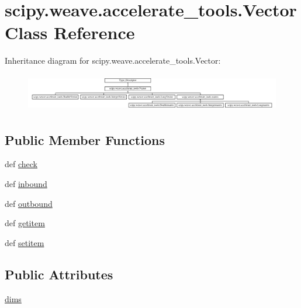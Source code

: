 \hypertarget{classscipy_1_1weave_1_1accelerate__tools_1_1Vector}{}\section{scipy.\+weave.\+accelerate\+\_\+tools.\+Vector Class Reference}
\label{classscipy_1_1weave_1_1accelerate__tools_1_1Vector}
Inheritance diagram for scipy.\+weave.\+accelerate\+\_\+tools.\+Vector\+:\begin{figure}[H]
\begin{center}
\leavevmode
\includegraphics[height=1.659259cm]{classscipy_1_1weave_1_1accelerate__tools_1_1Vector}
\end{center}
\end{figure}
\subsection*{Public Member Functions}
\begin{DoxyCompactItemize}
\item 
def \hyperlink{classscipy_1_1weave_1_1accelerate__tools_1_1Vector_ada2a78b6ea5d4e2d3ae79f5937684745}{check}
\item 
def \hyperlink{classscipy_1_1weave_1_1accelerate__tools_1_1Vector_a78512e6a66fc47f577a08cc29c08f6f4}{inbound}
\item 
def \hyperlink{classscipy_1_1weave_1_1accelerate__tools_1_1Vector_a616a86582ff5d44f320dcced4c043d4f}{outbound}
\item 
def \hyperlink{classscipy_1_1weave_1_1accelerate__tools_1_1Vector_a3c50924b1677c27d47796836c72b648e}{getitem}
\item 
def \hyperlink{classscipy_1_1weave_1_1accelerate__tools_1_1Vector_affd60fa08a0e20614a61fe873349cc9f}{setitem}
\end{DoxyCompactItemize}
\subsection*{Public Attributes}
\begin{DoxyCompactItemize}
\item 
\hyperlink{classscipy_1_1weave_1_1accelerate__tools_1_1Vector_a45cca692f967c175e2e731e3e2e53e89}{dims}
\end{DoxyCompactItemize}
